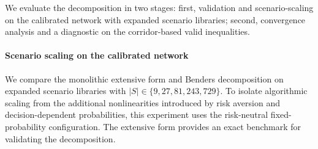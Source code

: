 \documentclass[final,3p,authoryear]{elsarticle}
\theoremstyle{definition}
\begin{document}
We evaluate the decomposition in two stages: first, validation and
scenario-scaling on the calibrated network with expanded scenario
libraries; second, convergence analysis and a diagnostic on the
corridor-based valid inequalities.
 
\paragraph{Scenario scaling on the calibrated network}

We compare the monolithic extensive form and Benders decomposition on
expanded scenario libraries with \(|S|\in\{9,27,81,243,729\}\). To
isolate algorithmic scaling from the additional nonlinearities introduced
by risk aversion and decision-dependent probabilities, this experiment
uses the risk-neutral fixed-probability configuration. The extensive form
provides an exact benchmark for validating the decomposition.
\end{document}
